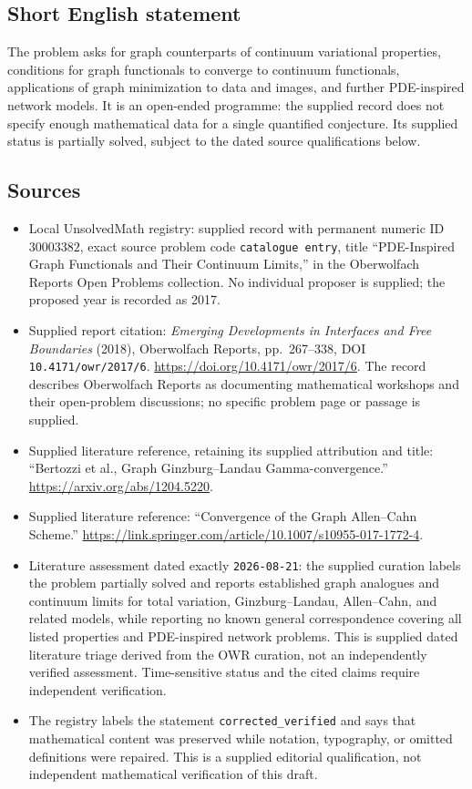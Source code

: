 \documentclass[11pt]{article}
\begin{document}
\subsection{Short English statement}
The problem asks for graph counterparts of continuum variational properties, conditions for graph functionals to converge to continuum functionals, applications of graph minimization to data and images, and further PDE-inspired network models. It is an open-ended programme: the supplied record does not specify enough mathematical data for a single quantified conjecture. Its supplied status is partially solved, subject to the dated source qualifications below.
\subsection{Sources}
\begin{itemize}
\item Local UnsolvedMath registry: supplied record with permanent numeric ID \(30003382\), exact source problem code \texttt{catalogue entry}, title ``PDE-Inspired Graph Functionals and Their Continuum Limits,'' in the Oberwolfach Reports Open Problems collection. No individual proposer is supplied; the proposed year is recorded as 2017.
\item Supplied report citation: \emph{Emerging Developments in Interfaces and Free Boundaries} (2018), Oberwolfach Reports, pp.\ 267--338, DOI \texttt{10.4171/owr/2017/6}. \url{https://doi.org/10.4171/owr/2017/6}. The record describes Oberwolfach Reports as documenting mathematical workshops and their open-problem discussions; no specific problem page or passage is supplied.
\item Supplied literature reference, retaining its supplied attribution and title: ``Bertozzi et al., Graph Ginzburg--Landau Gamma-convergence.'' \url{https://arxiv.org/abs/1204.5220}.
\item Supplied literature reference: ``Convergence of the Graph Allen--Cahn Scheme.'' \url{https://link.springer.com/article/10.1007/s10955-017-1772-4}.
\item Literature assessment dated exactly \texttt{2026-08-21}: the supplied curation labels the problem partially solved and reports established graph analogues and continuum limits for total variation, Ginzburg--Landau, Allen--Cahn, and related models, while reporting no known general correspondence covering all listed properties and PDE-inspired network problems. This is supplied dated literature triage derived from the OWR curation, not an independently verified assessment. Time-sensitive status and the cited claims require independent verification.
\item The registry labels the statement \texttt{corrected\_verified} and says that mathematical content was preserved while notation, typography, or omitted definitions were repaired. This is a supplied editorial qualification, not independent mathematical verification of this draft.
\end{itemize}
\end{document}
